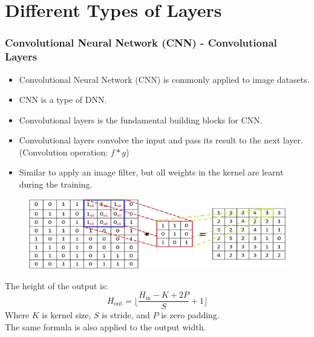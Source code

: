 \documentclass[aspectratio=169, 10pt]{beamer}
\begin{document}
\section{Different Types of Layers}
\begin{frame}
    \frametitle{Convolutional Neural Network (CNN) - Convolutional Layers}
    
    \begin{itemize}
        \item Convolutional Neural Network (CNN) is commonly applied to image datasets.
        \item CNN is a type of DNN.
        \item Convolutional layers is the fundamental building blocks for CNN.
        \item Convolutional layers convolve the input and pass its result to the next layer. (Convolution operation: $f*g$)
        \item Similar to apply an image filter, but all weights in the kernel are learnt during the training.
    \end{itemize}

    \begin{figure}
        \centering
        \includegraphics[width=0.3\columnwidth]{../imgs/conv.jpg}
    \end{figure}

    The height of the output is:
    \[
        H_{\text{out}} = \lfloor \frac{H_{\text{in}} - K + 2P}{S} + 1 \rfloor
    \]
    Where $K$ is kernel size, $S$ is stride, and $P$ is zero padding.\\
    The same formula is also applied to the output width.
\end{frame}
\end{document}
